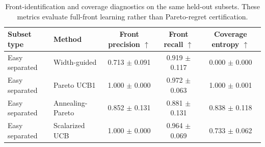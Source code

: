 \begin{table}[t]
\centering
\caption{Front-identification and coverage diagnostics on the same held-out subsets. These metrics evaluate full-front learning rather than Pareto-regret certification.}
\label{tab:real-front-coverage}
\scriptsize
\begin{tabular}{llccc}
\toprule
Subset type & Method & Front precision $\uparrow$ & Front recall $\uparrow$ & Coverage entropy $\uparrow$ \\
\midrule
Easy separated & Width-guided & 0.713 $\pm$ 0.091 & 0.919 $\pm$ 0.117 & 0.000 $\pm$ 0.000 \\
Easy separated & Pareto UCB1 & 1.000 $\pm$ 0.000 & 0.972 $\pm$ 0.063 & 1.000 $\pm$ 0.001 \\
Easy separated & Annealing-Pareto & 0.852 $\pm$ 0.131 & 0.881 $\pm$ 0.131 & 0.838 $\pm$ 0.118 \\
Easy separated & Scalarized UCB & 1.000 $\pm$ 0.000 & 0.964 $\pm$ 0.069 & 0.733 $\pm$ 0.062 \\
\bottomrule
\end{tabular}
\end{table}
